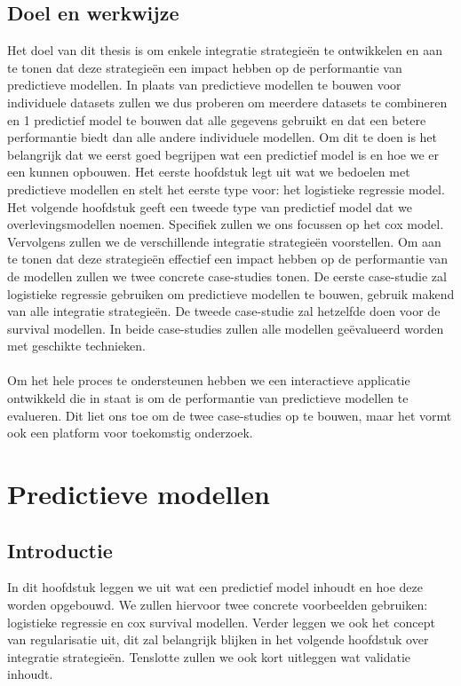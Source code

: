 \begin{abstract*}
\subsection{Doel en werkwijze}
Het doel van dit thesis is om enkele integratie strategie\"en te ontwikkelen en aan te tonen dat deze strategie\"en een impact hebben op de performantie van predictieve modellen. In plaats van predictieve modellen te bouwen voor individuele datasets zullen we dus proberen om meerdere datasets te combineren en 1 predictief model te bouwen dat alle gegevens gebruikt en dat een betere performantie biedt dan alle andere individuele modellen. Om dit te doen is het belangrijk dat we eerst goed begrijpen wat een predictief model is en hoe we er een kunnen opbouwen. Het eerste hoofdstuk legt uit wat we bedoelen met predictieve modellen en stelt het eerste type voor: het logistieke regressie model. Het volgende hoofdstuk geeft een tweede type van predictief model dat we overlevingsmodellen noemen. Specifiek zullen we ons focussen op het cox model. Vervolgens zullen we de verschillende integratie strategie\"en voorstellen. Om aan te tonen dat deze strategie\"en effectief een impact hebben op de performantie van de modellen zullen we twee concrete case-studies tonen. De eerste case-studie zal logistieke regressie gebruiken om predictieve modellen te bouwen, gebruik makend van alle integratie strategie\"en. De tweede case-studie zal hetzelfde doen voor de survival modellen. In beide case-studies zullen alle modellen ge\"evalueerd worden met geschikte technieken. \\ \\
Om het hele proces te ondersteunen hebben we een interactieve applicatie ontwikkeld die in staat is om de performantie van predictieve modellen te evalueren. Dit liet ons toe om de twee case-studies op te bouwen, maar het vormt ook een platform voor toekomstig onderzoek.

\section{Predictieve modellen}
\label{cha:D:predictieve-modellen}

\subsection{Introductie}
\label{sec:D:pm-introductie}
In dit hoofdstuk leggen we uit wat een predictief model inhoudt en hoe deze worden opgebouwd. We zullen hiervoor twee concrete voorbeelden gebruiken: logistieke regressie en cox survival modellen. Verder leggen we ook het concept van regularisatie uit, dit zal belangrijk blijken in het volgende hoofdstuk over integratie strategie\"en. Tenslotte zullen we ook kort uitleggen wat validatie inhoudt.


\end{abstract*}
